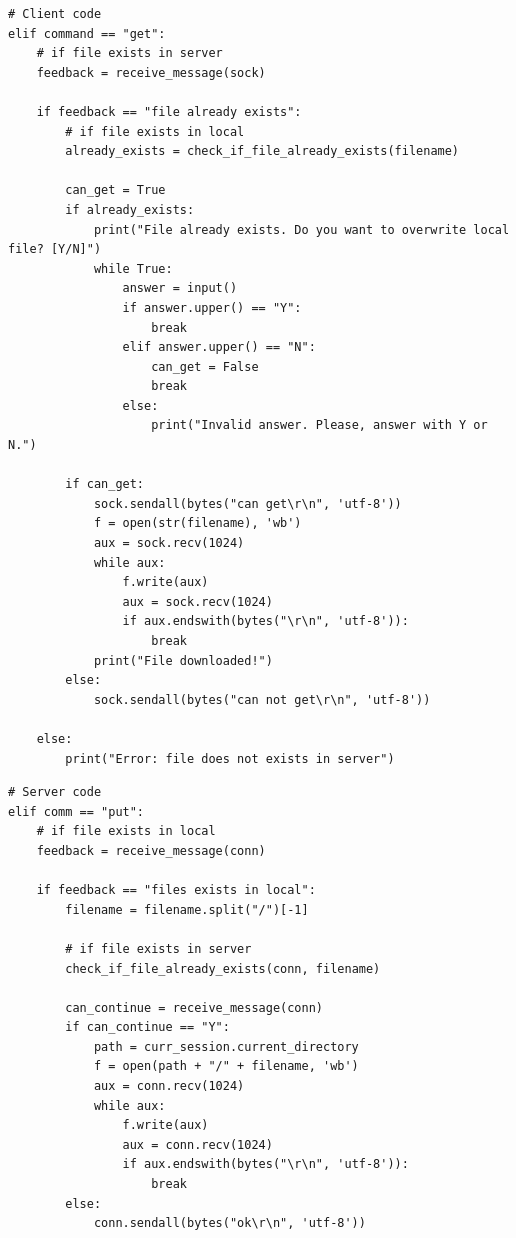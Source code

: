 \documentclass[conference]{IEEEtran}
\begin{document}
\begin{lstlisting}
# Client code
elif command == "get":
	# if file exists in server
	feedback = receive_message(sock)

	if feedback == "file already exists":
		# if file exists in local
		already_exists = check_if_file_already_exists(filename)

		can_get = True
		if already_exists:
			print("File already exists. Do you want to overwrite local file? [Y/N]")
			while True:
				answer = input()
				if answer.upper() == "Y":
					break
				elif answer.upper() == "N":
					can_get = False
					break
				else:
					print("Invalid answer. Please, answer with Y or N.")

		if can_get:
			sock.sendall(bytes("can get\r\n", 'utf-8'))
			f = open(str(filename), 'wb')
			aux = sock.recv(1024)
			while aux:
				f.write(aux)
				aux = sock.recv(1024)
				if aux.endswith(bytes("\r\n", 'utf-8')):
					break
			print("File downloaded!")
		else:
			sock.sendall(bytes("can not get\r\n", 'utf-8'))

	else:
		print("Error: file does not exists in server")
\end{lstlisting}

\begin{lstlisting}
# Server code
elif comm == "put":
	# if file exists in local
	feedback = receive_message(conn)

	if feedback == "files exists in local":
	    filename = filename.split("/")[-1]
	    
	    # if file exists in server
	    check_if_file_already_exists(conn, filename)

	    can_continue = receive_message(conn)
	    if can_continue == "Y":
	    	path = curr_session.current_directory
			f = open(path + "/" + filename, 'wb')
			aux = conn.recv(1024)
			while aux:
		    	f.write(aux)
		    	aux = conn.recv(1024)
		    	if aux.endswith(bytes("\r\n", 'utf-8')):
		        	break
		else:
			conn.sendall(bytes("ok\r\n", 'utf-8'))
\end{lstlisting}
\end{document}
